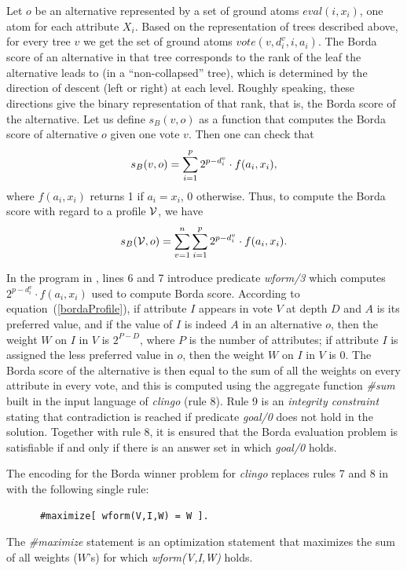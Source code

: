 Let $o$ be an alternative represented by a set of ground atoms 
$eval(i, x_i)$, one atom for each attribute $X_i$. Based on the representation
of trees described above, for every tree $v$ we get the set of ground atoms 
$vote(v,d^v_i,i,a_i)$. The Borda score of an alternative in that tree
corresponds to the rank of the leaf the alternative leads to (in a ``non-collapsed'' tree), which is
determined by the direction of descent (left or right) at each level. 
Roughly speaking, these directions give the binary representation of that 
rank, that is, the Borda score of the alternative. Let us define 
$s_{B}(v, o)$ as a function that computes the Borda score 
of alternative $o$ given one vote $v$. Then one can check that
\begin{equation} \label{bordaOneVote}
  \small
  s_{B}(v, o) = \sum^p_{i=1} 2^{p-d^v_i} \cdot f(a_i, x_i),
  \end{equation}
where $f(a_i, x_i)$ returns 1 if $a_i= x_i$, 0 otherwise.
Thus, to compute the Borda score with regard to a profile $\mathcal{V}$, we have 
  \begin{equation} \label{bordaProfile}
    \small
    s_{B}(\mathcal{V},o) = \sum^n_{v=1} \sum^p_{i=1} 2^{p-d^v_i} \cdot f(a_i, x_i).
  \end{equation}

In the program in ,
lines 6 and 7 introduce predicate \textit{wform/3} which
computes $2^{p-d^v_i} \cdot f(a_i, x_i)$ used to
compute Borda score.
According to equation~(\ref{bordaProfile}),
if attribute $I$ appears in vote $V$ at depth $D$
and $A$ is its preferred value, and if the value of $I$ is indeed $A$ in
an alternative $o$, then the weight $W$ on $I$ in $V$ is $2^{P-D}$, where $P$
is the number of attributes; if attribute $I$ is assigned the less preferred value
in $o$, then the weight $W$ on $I$ in $V$ is $0$. The Borda
score of the alternative is then equal to the sum of all the weights on
every attribute in every vote, and this is computed using the aggregate
function \textit{\#sum} built in the input language of \emph{clingo} (rule 8).
Rule 9 is an \textit{integrity constraint} stating that contradiction 
is reached if predicate \textit{goal/0} does not hold in the solution.
Together with rule 8, it is ensured that the Borda evaluation problem is 
satisfiable if and only if there is an answer set in which \textit{goal/0} holds.


The encoding for the Borda winner problem for \emph{clingo} 
replaces rules 7 and 8 in  with the following 
single rule:
  \begin{framed}
  \small
    \begin{verbatim}
      #maximize[ wform(V,I,W) = W ].
    \end{verbatim}
  \end{framed}
The \textit{\#maximize} statement is an optimization statement that 
maximizes the sum of all weights ($W$'s) 
for which \textit{wform(V,I,W)} holds.

